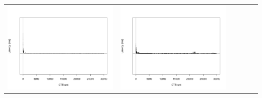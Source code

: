 \begin{table}[htbp]
{\begin{tabular}{l | ccccc}
\begin{minipage}{.15\textwidth}
     			 	\includegraphics[width=\linewidth]{images/lat-log-triple/I8}
    				 \end{minipage}
    			   &	 \begin{minipage}{.15\textwidth}\vspace{2pt}     							
     			 	\includegraphics[width=\linewidth]{images/lat-log-triple/I11}
    				 \end{minipage}
    			   &	 \begin{minipage}{.15\textwidth}\vspace{2pt}     							

\end{minipage}
\end{tabular}}
\end{table}

